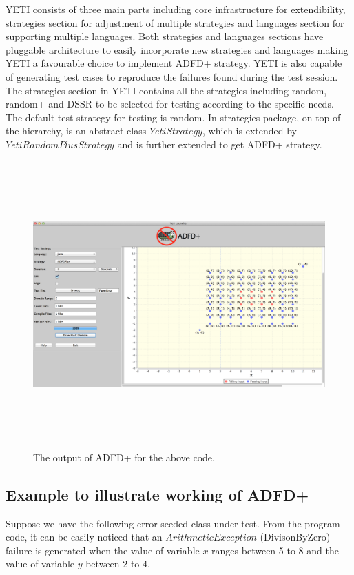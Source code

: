 YETI consists of three main parts including core infrastructure for extendibility, strategies section for adjustment of multiple strategies and 
languages section for supporting multiple languages. Both strategies and languages sections have pluggable architecture to easily incorporate new strategies and 
languages making YETI a favourable choice to implement ADFD+ strategy. YETI is also capable of generating test cases to reproduce the failures found during the test session. 
The strategies section in YETI contains all the strategies including random, random+ and DSSR to be selected for testing according to the specific needs. The default test 
strategy for testing is random. In strategies package, on top of the hierarchy, is an abstract class $YetiStrategy$, which is extended by $YetiRandomPlusStrategy$ and is further extended to get ADFD+ strategy.

\begin{figure}[ht]
\centering
\includegraphics[width=15.5cm,height=11cm]{chapter6/exampleError.png}
\caption{The output of ADFD+ for the above code.}
\label{fig:adfdPlusExample}
\end{figure}

\subsection{Example to illustrate working of ADFD+}\label{sec:intro6_5}
Suppose we have the following error-seeded class under test. From the program code, it can be easily noticed that an $ArithmeticException$ (DivisonByZero) failure is generated when the value of variable $x$ ranges between 5 to 8 and the value of variable $y$ between 2 to 4.

